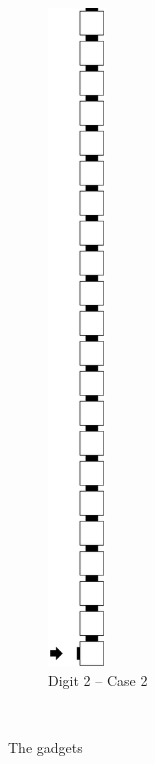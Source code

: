 \begin{itemize}
\begin{figure}[H]
\begin{subfigure}[t]{0.17\textwidth}
                \includegraphics[width=0.17\textwidth]{warping/post_warp_case2_digit2_msr}
                \caption{\label{fig:post_warp_case2_digit2_msr} Digit 2 -- Case 2}
            \end{subfigure}%
            ~
            \caption{\label{fig:post_warp_gadgets} The {\postwarp} gadgets }
        \end{figure}

    \end{itemize}
